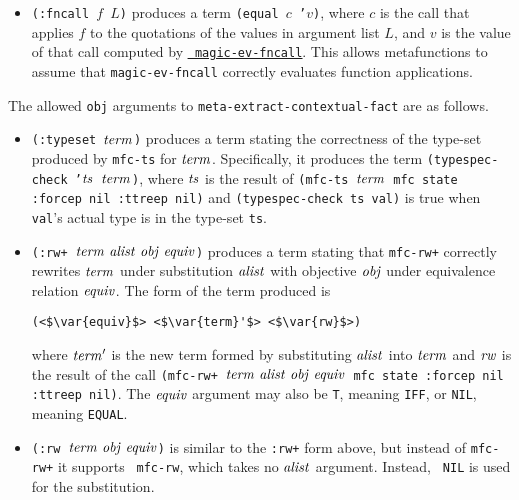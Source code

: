 \begin{itemize}
\item {\tt (:fncall $f$ $L$)} produces a term {\tt (equal $c$ '$v$)}, where
    $c$ is the call that applies $f$ to the quotations of the values in argument list $L$, and $v$ is
    the value of that call computed by
    \href{http://www.cs.utexas.edu/users/moore/acl2/manuals/current/manual/index.html?topic=ACL2\_\_\_\_MAGIC-EV-FNCALL}{\underline{\tt
        magic-\allowbreak{}ev-\allowbreak{}fncall}}.  This allows
    metafunctions to assume that {\tt magic-ev-fncall}
    correctly evaluates function applications.

\end{itemize}

The allowed {\tt obj} arguments to {\tt meta-extract-contextual-fact} are as follows.

\begin{itemize}

\item {\tt (:typeset $\mathit{term}$)} produces a term stating the correctness of
    the type-set produced by {\tt mfc-ts} for $\mathit{term}$.  Specifically, it produces the term
    {\tt (typespec-check '$\mathit{ts}$ $\mathit{term}$)}, where $\mathit{ts}$ is
    the result of {\tt (mfc-ts $\mathit{term}$ mfc state :forcep nil :ttreep nil)} and
    {\tt (typespec-check ts val)} is true when {\tt val}'s actual type is in the type-set {\tt ts}.

  \item {\tt (:rw+ $\var{term}\ \var{alist}\ \var{obj}\ \var{equiv}$)}
    produces a term stating that {\tt mfc-rw+} correctly rewrites
    $\mathit{term}$ under substitution $\mathit{alist}$ with objective
    $\mathit{obj}$ under equivalence relation $\mathit{equiv}$.  The form of the term produced is
  \begin{lstlisting}[basicstyle=\linespread{0.4}\normalsize\ttfamily]
    (<$\var{equiv}$> <$\var{term}'$> <$\var{rw}$>)
  \end{lstlisting}
  where $\mathit{term}'$ is the new term formed by substituting
  $\mathit{alist}$ into $\mathit{term}$ and $\mathit{rw}$ is the result of the call
  {\tt (mfc-rw+ $\var{term}\ \var{alist}\ \var{obj}\ \var{equiv}$ mfc state :forcep nil :ttreep nil)}.
  The $\mathit{equiv}$ argument may also be {\tt T}, meaning
  {\tt IFF}, or {\tt NIL}, meaning {\tt EQUAL}.

\item {\tt (:rw $\var{term}\ \var{obj}\ \var{equiv}$)} is similar to the
  {\tt :rw+} form above, but instead of {\tt mfc-rw+} it supports {\tt
    mfc-rw}, which takes no $\mathit{alist}$ argument.  Instead, {\tt
    NIL} is used for the substitution.


\end{itemize}
